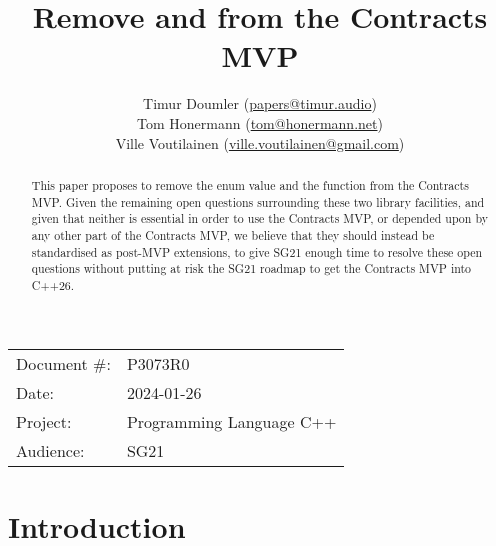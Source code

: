 

 \usepackage[bottom]{footmisc} 


\title{Remove  and  from the Contracts MVP}
\author{ Timur Doumler \small(\href{mailto:papers@timur.audio}{papers@timur.audio}) \\
Tom Honermann \small(\href{mailto:tom@honermann.net}{tom@honermann.net}) \\
Ville Voutilainen \small(\href{mailto:ville.voutilainen@gmail.com}{ville.voutilainen@gmail.com}) 
}
\date{}
\maketitle

\begin{tabular}{ll}
Document \#: & P3073R0 \\
Date: &2024-01-26 \\
Project: & Programming Language C++ \\
Audience: & SG21
\end{tabular}

\begin{abstract}
This paper proposes to remove the enum value  and the function \mbox{} from the Contracts MVP. Given the remaining open questions surrounding these two library facilities, and given that neither is essential in order to use the Contracts MVP, or depended upon by any other part of the Contracts MVP, we believe that they should instead be standardised as post-MVP extensions, to give SG21 enough time to resolve these open questions without putting at risk the SG21 roadmap to get the Contracts MVP into C++26.
\end{abstract}

\section{Introduction}
\label{sec:intro}

